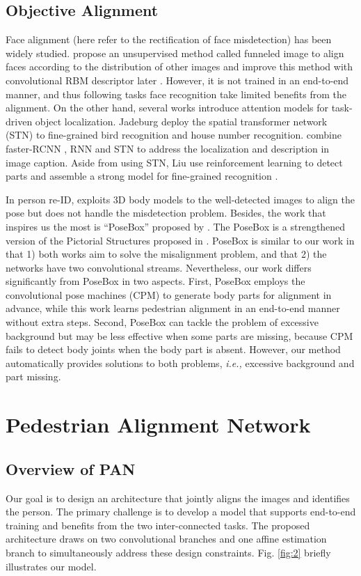 \subsection{Objective Alignment}
Face alignment (here refer to the rectification of face misdetection) has been widely studied. \cite{huang2007unsupervised} propose an unsupervised method called funneled image to align faces according to the distribution of other images and improve this method with convolutional RBM descriptor later \cite{huang2012learning}. However, it is not trained in an end-to-end manner, and thus following tasks \ie face recognition take limited benefits from the alignment. On the other hand, several works introduce attention models for task-driven object localization. Jadeburg \etal \cite{jaderberg2015spatial} deploy the spatial transformer network (STN) to fine-grained bird recognition and house number recognition. \cite{johnson2015densecap} combine faster-RCNN \cite{girshick2015fast}, RNN and STN to address the localization and description in image caption. Aside from using STN, Liu \etal use reinforcement learning to detect parts and assemble a strong model for fine-grained recognition \cite{liu2016fully}.

In person re-ID, \cite{baltieri2015mapping} exploits 3D body models to the well-detected images to align the pose but does not handle the misdetection problem. Besides, the work that inspires us the most is ``PoseBox'' proposed by \cite{zheng2017pose}. The PoseBox is a strengthened version of the Pictorial Structures proposed in \cite{cheng2011custom}. PoseBox is similar to our work in that 1) both works aim to solve the misalignment problem, and that 2) the networks have two convolutional streams. Nevertheless, our work differs significantly from PoseBox in two aspects. First, PoseBox employs the convolutional pose machines (CPM) to generate body parts for alignment in advance, while this work learns pedestrian alignment in an end-to-end manner without extra steps. Second, PoseBox can tackle the problem of excessive background but may be less effective when some parts are missing, because CPM fails to detect body joints when the body part is absent. However, our method automatically provides solutions to both problems, \emph{i.e.,} excessive background and part missing. 


\section{Pedestrian Alignment Network} \label{method}
\subsection{Overview of PAN}
Our goal is to design an architecture that jointly aligns the images and identifies the person. The primary challenge is to develop a model that supports end-to-end training and benefits from the two inter-connected tasks. The proposed architecture draws on two convolutional branches and one affine estimation branch to simultaneously address these design constraints. Fig. \ref{fig:2} briefly illustrates our model. 

